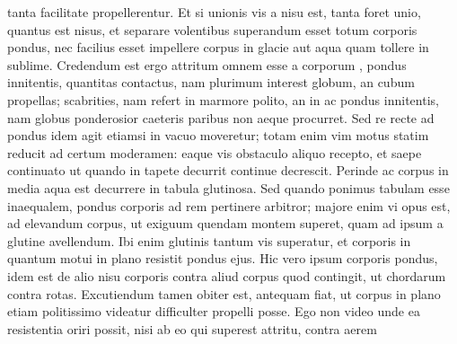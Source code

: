 \noindent tanta facilitate propellerentur. Et si unionis vis\protect{} a nisu est, tanta foret unio, quantus est nisus, et separare volentibus superandum esset totum corporis pondus\protect{}, nec facilius esset impellere corpus in glacie aut aqua quam tollere in sublime. Credendum est ergo attritum\protect{} omnem esse a corporum , pondus\protect{} innitentis, quantitas contactus, nam plurimum interest globum, an cubum propellas; scabrities, nam refert in marmore polito, an in  ac pondus\protect{} innitentis, nam globus ponderosior caeteris paribus non aeque procurret. Sed re recte  ad  pondus\protect{} idem agit etiamsi in vacuo moveretur; totam enim vim\protect{} motus statim reducit ad certum moderamen: eaque vis\protect{} obstaculo aliquo recepto, et saepe continuato ut quando in tapete decurrit continue decrescit. Perinde ac  corpus in media aqua  est  decurrere in tabula glutinosa. Sed quando ponimus tabulam esse inaequalem, pondus\protect{} corporis ad rem pertinere arbitror; majore enim vi\protect{} opus est, ad elevandum corpus, ut exiguum quendam montem superet, quam ad ipsum a glutine avellendum. Ibi enim glutinis tantum vis\protect{} superatur, et corporis in quantum motui in plano resistit pondus\protect{} ejus. Hic vero ipsum corporis pondus\protect{}, idem est de alio nisu corporis contra aliud corpus quod contingit, ut chordarum contra rotas. Excutiendum tamen obiter est, antequam  fiat, ut corpus in plano etiam politissimo videatur difficulter propelli posse. Ego non video unde ea resistentia\protect{} oriri possit, nisi ab eo qui superest attritu\protect{}, contra aerem 